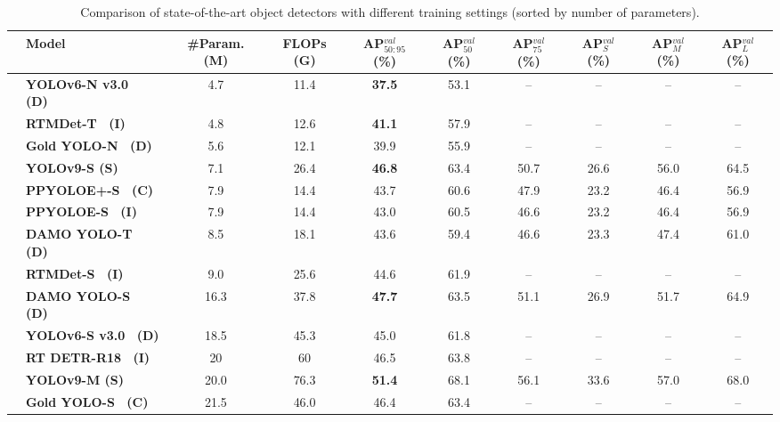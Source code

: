\documentclass[10pt,twocolumn,letterpaper]{article}
\begin{document}
	\begin{table}[t]
		\centering
		\begin{threeparttable}[t]
			\footnotesize
			\caption{Comparison of state-of-the-art object detectors with different training settings (sorted by number of parameters).}
			\label{table:param}
			\setlength\tabcolsep{4.0pt}
			\begin{tabular}{l|lcccccccc}
				\toprule
				& \textbf{Model} & \textbf{\#Param. (M)} & \textbf{FLOPs (G)} & \textbf{AP$^{val}_{50:95}$ (\%)} & \textbf{AP$^{val}_{50}$ (\%)} & \textbf{AP$^{val}_{75}$ (\%)} & \textbf{AP$^{val}_{S}$ (\%)} & \textbf{AP$^{val}_{M}$ (\%)} & \textbf{AP$^{val}_{L}$ (\%)} \\
				\midrule
				& \textbf{YOLOv6-N v3.0~\cite{li2023yolov6} (D)} & 4.7 & 11.4 & \textbf{37.5} & 53.1 & -- & -- & -- & -- \\
				& \textbf{RTMDet-T~\cite{lyu2022rtmdet} (I)} & 4.8 & 12.6 & \textbf{41.1} & 57.9 & -- & -- & -- & -- \\
				& \textbf{Gold YOLO-N~\cite{wang2023gold} (D)} & 5.6 & 12.1 & 39.9 & 55.9 & -- & -- & -- & -- \\
				& \textbf{YOLOv9-S (S)} & 7.1 & 26.4 &\textbf{ 46.8} & 63.4 & 50.7 & 26.6 & 56.0 & 64.5 \\
				& \textbf{PPYOLOE+-S~\cite{xu2022pp} (C)} & 7.9 & 14.4 & 43.7 & 60.6 & 47.9 & 23.2 & 46.4 & 56.9 \\
				& \textbf{PPYOLOE-S~\cite{xu2022pp} (I)} & 7.9 & 14.4 & 43.0 & 60.5 & 46.6 & 23.2 & 46.4 & 56.9 \\
				& \textbf{DAMO YOLO-T~\cite{xu2022damo} (D)} & 8.5 & 18.1 & 43.6 & 59.4 & 46.6 & 23.3 & 47.4 & 61.0 \\
				& \textbf{RTMDet-S~\cite{lyu2022rtmdet} (I)} & 9.0 & 25.6 & 44.6 & 61.9 & -- & -- & -- & -- \\
				& \textbf{DAMO YOLO-S~\cite{xu2022damo} (D)} & 16.3 & 37.8 & \textbf{47.7} & 63.5 & 51.1 & 26.9 & 51.7 & 64.9 \\
				& \textbf{YOLOv6-S v3.0~\cite{li2023yolov6} (D)} & 18.5 & 45.3 & 45.0 & 61.8 & -- & -- & -- & -- \\
				& \textbf{RT DETR-R18~\cite{lv2023detrs} (I)} & 20 & 60 & 46.5 & 63.8 & -- & -- & -- & -- \\
				& \textbf{YOLOv9-M (S)} & 20.0 & 76.3 & \textbf{51.4} & 68.1 & 56.1 & 33.6 & 57.0 & 68.0 \\
				& \textbf{Gold YOLO-S~\cite{wang2023gold} (C)} & 21.5 & 46.0 & 46.4 & 63.4 & -- & -- & -- & -- \\

\end{tabular}
\end{threeparttable}
\end{table}
\end{document}
